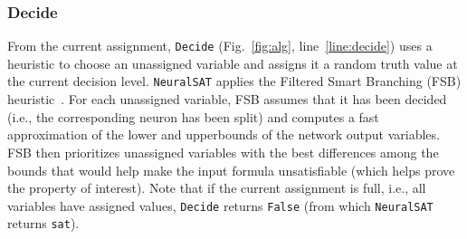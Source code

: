 \documentclass[oneside,11pt,dvipsnames]{book}
\numberwithin{equation}{section}
\theoremstyle{definition}
\theoremstyle{remark}
\newcommand{\tool}{\texttt{NeuralSAT}}
\begin{document}
\subsubsection{Decide}\label{sec:decide}

From the current assignment, \texttt{Decide} (Fig.~\ref{fig:alg}, line~\ref{line:decide}) uses a heuristic to choose an unassigned variable and assigns it a random truth value at the current decision level.
\tool{} applies the Filtered Smart Branching (FSB) heuristic~\cite{bunel2018unified,de2021improved}. For each unassigned variable, FSB assumes that it has been decided (i.e., the corresponding neuron has been split) and computes a fast approximation of the lower and upperbounds of the network output variables.  FSB then prioritizes unassigned variables with the best differences among the bounds that would help make the input formula unsatisfiable (which helps prove the property of interest).
Note that if the current assignment is full, i.e., all variables have assigned values, \texttt{Decide} returns \texttt{False} (from which \tool{} returns \texttt{sat}).






\end{document}
